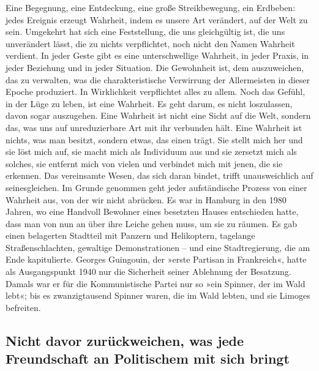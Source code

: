 Eine Begegnung, eine Entdeckung, eine große Streikbewegung, ein
Erdbeben: jedes Ereignis erzeugt Wahrheit, indem es unsere Art
verändert, auf der Welt zu sein. Umgekehrt hat sich eine
Feststellung, die uns gleichgültig ist, die uns unverändert lässt,
die zu nichts verpflichtet, noch nicht den Namen Wahrheit verdient.
In jeder Geste gibt es eine unterschwellige Wahrheit, in jeder
Praxis, in jeder Beziehung und in jeder Situation. Die Gewohnheit
ist, dem auszuweichen, das zu verwalten, was die charakteristische
Verwirrung der Allermeisten in dieser Epoche produziert. In
Wirklichkeit verpflichtet alles zu allem. Noch das Gefühl, in der
Lüge zu leben, ist eine Wahrheit. Es geht darum, es nicht
loszulassen, davon sogar auszugehen. Eine Wahrheit ist nicht eine
Sicht auf die Welt, sondern das, was uns auf unreduzierbare Art mit
ihr verbunden hält. Eine Wahrheit ist nichts, was man besitzt,
sondern etwas, das einen trägt. Sie stellt mich her und sie löst
mich auf, sie macht mich als Individuum aus und sie zersetzt mich
als solches, sie entfernt mich von vielen und verbindet mich mit
jenen, die sie erkennen. Das vereinsamte Wesen, das sich daran
bindet, trifft unausweichlich auf seinesgleichen. Im Grunde
genommen geht jeder aufständische Prozess von einer Wahrheit aus,
von der wir nicht abrücken. Es war in Hamburg in den 1980 Jahren,
wo eine Handvoll Bewohner eines besetzten Hauses entschieden hatte,
dass man von nun an über ihre Leiche gehen muss, um sie zu räumen.
Es gab einen belagerten Stadtteil mit Panzern und Helikoptern,
tagelange Straßenschlachten, gewaltige Demonstrationen – und eine
Stadtregierung, die am Ende kapitulierte. Georges Guingouin, der
»erste Partisan in Frankreich«, hatte als Ausgangspunkt 1940 nur
die Sicherheit seiner Ablehnung der Besatzung. Damals war er für
die Kommunistische Partei nur so »ein Spinner, der im Wald lebt«;
bis es zwanzigtausend Spinner waren, die im Wald lebten, und sie
Limoges befreiten.

\subsection{Nicht davor zurückweichen, was jede Freundschaft an 
Politischem mit sich bringt}

